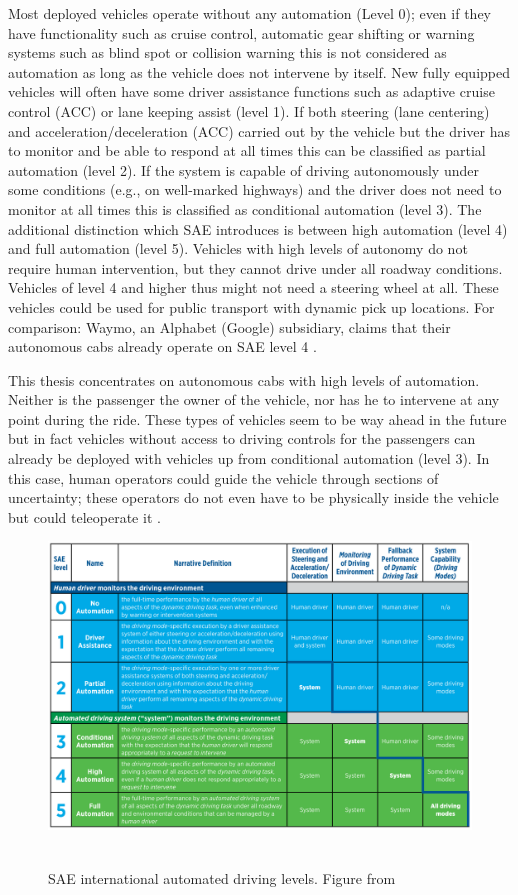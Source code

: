 Most deployed vehicles operate without any automation (Level 0); even if they have functionality such as cruise control, automatic gear shifting or warning systems such as blind spot or collision warning this is not considered as automation as long as the vehicle does not intervene by itself. 
New fully equipped vehicles will often have some driver assistance functions such as adaptive cruise control (ACC) or lane keeping assist (level 1). If both steering (lane centering) and acceleration/deceleration (ACC) carried out by the vehicle but the driver has to monitor and be able to respond at all times this can be classified as partial automation (level 2). If the system is capable of driving autonomously under some conditions (e.g., on well-marked highways) and the driver does not need to monitor at all times this is classified as conditional automation (level 3). The additional distinction which SAE introduces is between high automation (level 4) and full automation (level 5). Vehicles with high levels of autonomy do not require human intervention, but they cannot drive under all roadway conditions. Vehicles of level 4 and higher thus might not need a steering wheel at all. These vehicles could be used for public transport with dynamic pick up locations. For comparison: Waymo, an Alphabet (Google) subsidiary, claims that their autonomous cabs already operate on SAE level 4 \citep{Waymo2018DriverlessApplication}. 

This thesis concentrates on autonomous cabs with high levels of automation. Neither is the passenger the owner of the vehicle, nor has he to intervene at any point during the ride. These types of vehicles seem to be way ahead in the future but in fact vehicles without access to driving controls for the passengers can already be deployed with vehicles up from conditional automation (level 3). In this case, human operators could guide the vehicle through sections of uncertainty; these operators do not even have to be physically inside the vehicle but could teleoperate it \citet{Hollander2016TheSystems}.  

\begin{figure}
    \includegraphics[width=1\textwidth]{fig/SAE}\hfill\
    \caption[SAE international automated driving levels]{SAE international automated driving levels. Figure from \cite{SAEinternational2016}}
    \label{fig:SAE}
\end{figure}

